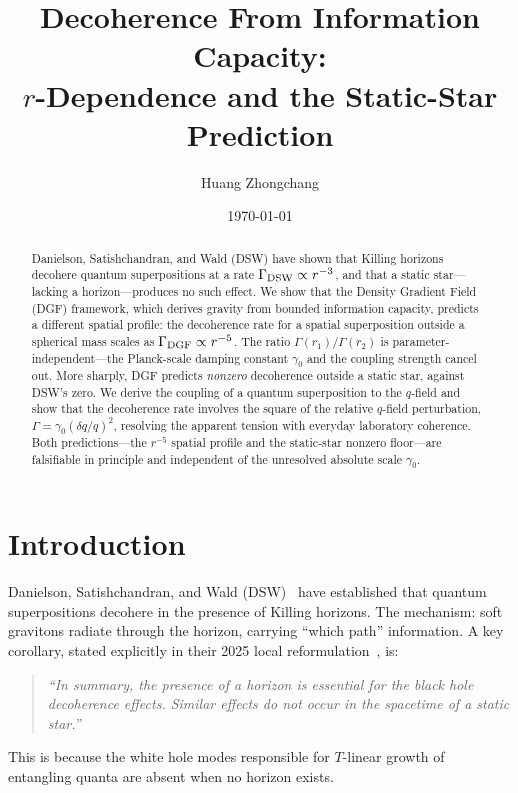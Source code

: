 \documentclass[aps,prl,twocolumn,showpacs,superscriptaddress,preprintnumbers]{revtex4-2}
\begin{document}
\title{Decoherence From Information Capacity: \\
$r$-Dependence and the Static-Star Prediction}

\author{Huang Zhongchang}

\date{\today}

\begin{abstract}
Danielson, Satishchandran, and Wald (DSW) have shown that Killing horizons decohere quantum superpositions at a rate $\Gamma_{\rm DSW}\propto r^{-3}$, and that a static star---lacking a horizon---produces no such effect.
We show that the Density Gradient Field (DGF) framework, which derives gravity from bounded information capacity, predicts a different spatial profile: the decoherence rate for a spatial superposition outside a spherical mass scales as $\Gamma_{\rm DGF}\propto r^{-5}$.
The ratio $\Gamma(r_1)/\Gamma(r_2)$ is parameter-independent---the Planck-scale damping constant $\gamma_0$ and the coupling strength cancel out.
More sharply, DGF predicts \emph{nonzero} decoherence outside a static star, against DSW's zero.
We derive the coupling of a quantum superposition to the $q$-field and show that the decoherence rate involves the square of the relative $q$-field perturbation, $\Gamma=\gamma_0(\delta q/q)^2$, resolving the apparent tension with everyday laboratory coherence.
Both predictions---the $r^{-5}$ spatial profile and the static-star nonzero floor---are falsifiable in principle and independent of the unresolved absolute scale $\gamma_0$.
\end{abstract}

\maketitle

\section{Introduction}

Danielson, Satishchandran, and Wald (DSW)~\cite{Danielson:2022a,Danielson:2023,Danielson:2024} have established that quantum superpositions decohere in the presence of Killing horizons.
The mechanism: soft gravitons radiate through the horizon, carrying ``which path'' information.
A key corollary, stated explicitly in their 2025 local reformulation~\cite{Danielson:2024}, is:
\begin{quote}
\emph{``In summary, the presence of a horizon is essential for the black hole decoherence effects.
Similar effects do not occur in the spacetime of a static star.''}
\end{quote}
This is because the white hole modes responsible for $T$-linear growth of entangling quanta are absent when no horizon exists.
\end{document}
